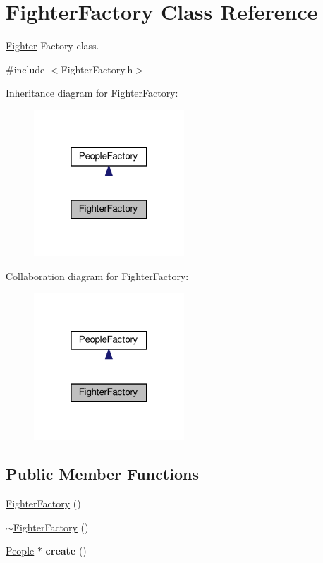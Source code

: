 \hypertarget{classFighterFactory}{}\section{Fighter\+Factory Class Reference}
\label{classFighterFactory}


\hyperlink{classFighter}{Fighter} Factory class.  




{\ttfamily \#include $<$Fighter\+Factory.\+h$>$}



Inheritance diagram for Fighter\+Factory\+:\nopagebreak
\begin{figure}[H]
\begin{center}
\leavevmode
\includegraphics[width=160pt]{classFighterFactory__inherit__graph}
\end{center}
\end{figure}


Collaboration diagram for Fighter\+Factory\+:\nopagebreak
\begin{figure}[H]
\begin{center}
\leavevmode
\includegraphics[width=160pt]{classFighterFactory__coll__graph}
\end{center}
\end{figure}
\subsection*{Public Member Functions}
\begin{DoxyCompactItemize}
\item 
\hyperlink{classFighterFactory_a3853dc992255a5dbed462a4c14e62b2d}{Fighter\+Factory} ()
\item 
\hyperlink{classFighterFactory_a499708d032968c812916d5b7d1188c37}{$\sim$\+Fighter\+Factory} ()
\item 
\mbox{\label{classFighterFactory_a63f0d41ba6a00132c490a76a99cf220d}} 
\hyperlink{classPeople}{People} $\ast$ {\bfseries create} ()
\end{DoxyCompactItemize}



